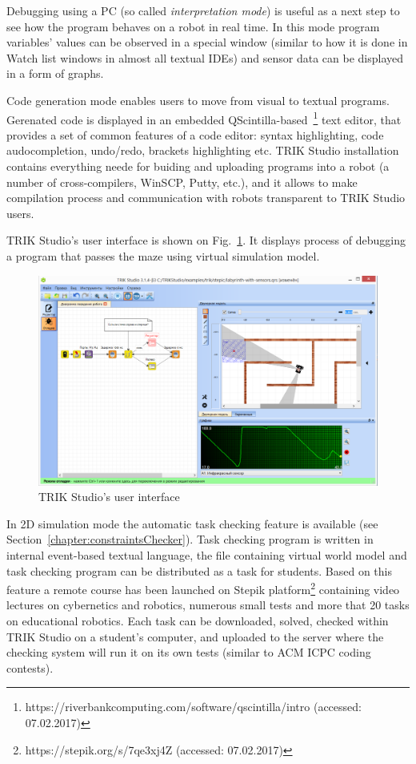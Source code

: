 \documentclass[conference]{IEEEtran}
\begin{document}
Debugging using a PC (so called \textit{interpretation mode}) is useful as a next step to see how the program behaves on a robot in real time. In this mode program variables' values can be observed in a special window (similar to how it is done in Watch list windows in almost all textual IDEs) and sensor data can be displayed in a form of graphs. 

Code generation mode enables users to move from visual to textual programs. Gerenated code is displayed in an embedded QScintilla-based~\footnote{https://riverbankcomputing.com/software/qscintilla/intro (accessed: 07.02.2017)} text editor, that provides a set of common features of a code editor: syntax highlighting, code audocompletion, undo/redo, brackets highlighting etc. TRIK Studio installation contains everything neede for buiding and uploading programs into a robot (a number of cross-compilers, WinSCP, Putty, etc.), and it allows to make compilation process and communication with robots transparent to TRIK Studio users.

TRIK Studio's user interface is shown on Fig.~\ref{image:TS_interface}. It displays process of debugging a program that passes the maze using virtual simulation model.

\begin{figure}[ht]
    \centering
    \includegraphics[width=\textwidth]{TS_CF_Labyrinth.png}
    \caption{TRIK Studio's user interface}
    \label{image:TS_interface}
\end{figure}

In 2D simulation mode the automatic task checking feature is available (see Section~\ref{chapter:constraintsChecker}). Task checking program is written in internal event-based textual language, the file containing virtual world model and task checking program can be distributed as a task for students. Based on this feature a remote course has been launched on Stepik platform\footnote{https://stepik.org/s/7qe3xj4Z (accessed: 07.02.2017)} containing video lectures on cybernetics and robotics, numerous small tests and more that 20 tasks on educational robotics. Each task can be downloaded, solved, checked within TRIK Studio on a student's computer, and uploaded to the server where the checking system will run it on its own tests (similar to ACM ICPC coding contests).
\end{document}

